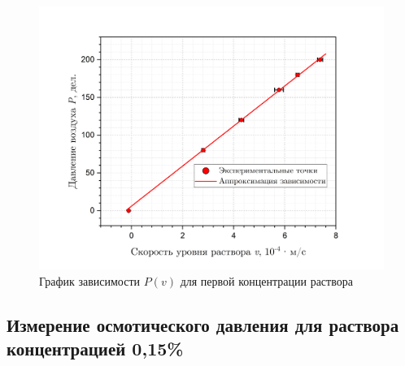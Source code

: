 \documentclass[a4paper, 12pt]{article}
\begin{document}
        \begin{figure}[H]
            \centering
            \includegraphics[width = 14 cm]{images/graph_3per.png}
            \caption{График зависимости $P(v)$ для первой концентрации раствора}
            \label{graph:3per}
        \end{figure}

        \subsection{Измерение осмотического давления для раствора концентрацией 0,15\%}
        
\end{document}
